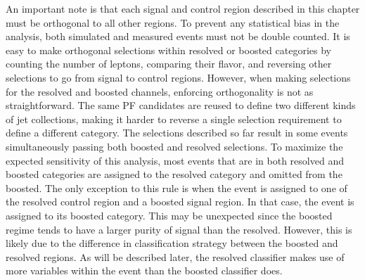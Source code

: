 An important note is that each signal and control region described in this chapter
must be orthogonal to all other regions.
To prevent any statistical bias in the analysis,
both simulated and measured events must not be double counted.
It is easy to make orthogonal selections within resolved or boosted categories
by counting the number of leptons, comparing their flavor, and reversing other selections
to go from signal to control regions.
However, when making selections for the resolved and boosted channels,
enforcing orthogonality is not as straightforward.
The same PF candidates are reused to define two different kinds of jet collections,
making it harder to reverse a single selection requirement to define a different category.
The selections described so far result in some events simultaneously passing
both boosted and resolved selections.
To maximize the expected sensitivity of this analysis,
most events that are in both resolved and boosted categories are assigned to the
resolved category and omitted from the boosted.
The only exception to this rule is when the event is assigned to
one of the resolved control region and a boosted signal region.
In that case, the event is assigned to its boosted category.
This may be unexpected since the boosted regime tends to have a larger purity of signal than the resolved.
However, this is likely due to the difference in classification strategy between the boosted and resolved regions.
As will be described later,
the resolved classifier makes use of more variables within the event than the boosted classifier does.
